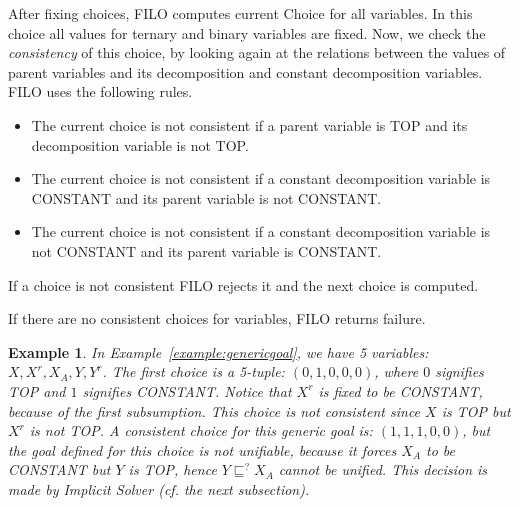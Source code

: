 \documentclass{article}
\newtheorem{example}{Example}
\newcommand{\green}[1]{\todo[inline, color=green!40]{#1}}
\begin{document}
After fixing choices, FILO computes current Choice for all variables. In this choice all values for 
ternary and binary variables are fixed. Now, we check the \emph{consistency} of this choice, by
looking again at the relations between the values of parent variables and its decomposition and constant decomposition variables. 
FILO uses the following rules.

\begin{itemize}
	\item The current choice is not consistent if a parent variable is TOP and its decomposition variable is not TOP.
	\item The current choice is not consistent if a constant decomposition variable is CONSTANT and 
	its parent variable is not CONSTANT.
	\item The current choice is not consistent if a constant decomposition variable is not CONSTANT and
	its parent variable is CONSTANT.
\end{itemize}

If a choice is not consistent FILO rejects it and the next choice is computed.

%


If there are no consistent choices for variables, FILO returns failure.

\begin{example}\label{example:choice}
In Example~\ref{example:genericgoal}, we have 5 variables: $X, X^r, X_A,  Y, Y^r$. The first choice is a 5-tuple: $(0,1,0,0,0)$, where $0$ signifies TOP and $1$ signifies CONSTANT.
Notice that $X^r$ is fixed to be CONSTANT, because of the first  subsumption.
This choice is not consistent since  $X$ is TOP but $X^r$ is not TOP.
A consistent choice for this generic goal is: $(1, 1 ,1 , 0,0)$, but the goal defined for this choice is not unifiable, because it forces $X_A$ to be CONSTANT but $Y$ is TOP, hence
$Y \sqsubseteq^? X_A$ cannot be unified. This decision is made by Implicit Solver (cf. the next subsection).
\end{example}
\end{document}
